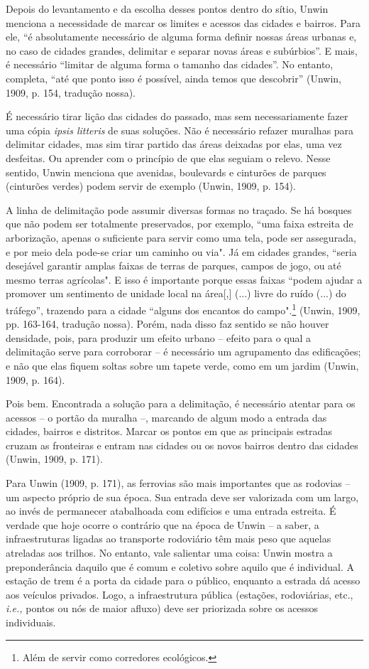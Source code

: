 \documentclass[12pt, a4paper]{book} %
\begin{document}
        Depois do levantamento e da escolha desses pontos dentro do sítio, Unwin menciona a necessidade de marcar os limites e acessos das cidades e bairros. Para ele, ``é absolutamente necessário de alguma forma definir nossas áreas urbanas e, no caso de cidades grandes, delimitar e separar novas áreas e subúrbios''. E mais, é necessário ``limitar de alguma forma o tamanho das cidades''. No entanto, completa, ``até que ponto isso é possível, ainda temos que descobrir'' (Unwin, 1909, p. 154, tradução nossa). 

        É necessário tirar lição das cidades do passado, mas sem necessariamente fazer uma cópia \textit{ipsis litteris} de suas soluções. Não é necessário refazer muralhas para delimitar cidades, mas sim tirar partido das áreas deixadas por elas, uma vez desfeitas. Ou aprender com o princípio de que elas seguiam o relevo. Nesse sentido, Unwin menciona que avenidas, boulevards e cinturões de parques (cinturões verdes) podem servir de exemplo (Unwin, 1909, p. 154).

        A linha de delimitação pode assumir diversas formas no traçado. Se há bosques que não podem ser totalmente preservados, por exemplo, ``uma faixa estreita de arborização, apenas o suficiente para servir como uma tela, pode ser assegurada, e por meio dela pode-se criar um caminho ou via". Já em cidades grandes, ``seria desejável garantir amplas faixas de terras de parques, campos de jogo, ou até mesmo terras agrícolas". E isso é importante porque essas faixas ``podem ajudar a promover um sentimento de unidade local na área[,] (...) livre do ruído (...) do tráfego'', trazendo para a cidade ``alguns dos encantos do campo".\footnote[7]{Além de servir como corredores ecológicos.} (Unwin, 1909, pp. 163-164, tradução nossa). Porém, nada disso faz sentido se não houver densidade, pois, para produzir um efeito urbano – efeito para o qual a delimitação serve para corroborar – é necessário um agrupamento das edificações; e não que elas fiquem soltas sobre um tapete verde, como em um jardim (Unwin, 1909, p. 164).

        Pois bem. Encontrada a solução para a delimitação, é necessário atentar para os acessos – o portão da muralha –, marcando de algum modo a entrada das cidades, bairros e distritos. Marcar os pontos em que as principais estradas cruzam as fronteiras e entram nas cidades ou os novos bairros dentro das cidades (Unwin, 1909, p. 171).

        Para Unwin (1909, p. 171), as ferrovias são mais importantes que as rodovias – um aspecto próprio de sua época. Sua entrada deve ser valorizada com um largo, ao invés de permanecer atabalhoada com edifícios e uma entrada estreita. É verdade que hoje ocorre o contrário que na época de Unwin – a saber, a infraestruturas ligadas ao transporte rodoviário têm mais peso que aquelas atreladas aos trilhos. No entanto, vale salientar uma coisa: Unwin mostra a preponderância daquilo que é comum e coletivo sobre aquilo que é individual. A estação de trem é a porta da cidade para o público, enquanto a estrada dá acesso aos veículos privados. Logo, a infraestrutura pública (estações, rodoviárias, etc., \textit{i.e.,} pontos ou nós de maior afluxo) deve ser priorizada sobre os acessos individuais.
\end{document}
